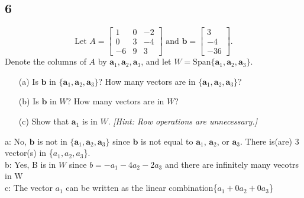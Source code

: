 \documentclass{article}
\begin{document}
\subsection*{6}
\[
\text{Let } A = \begin{bmatrix} 1 & 0 & -2 \\ 0 & 3 & -4 \\ -6 & 9 & 3 \end{bmatrix} 
\text{ and } \mathbf{b} = \begin{bmatrix} 3 \\ -4 \\ -36 \end{bmatrix}.
\]
Denote the columns of \( A \) by \( \mathbf{a}_1, \mathbf{a}_2, \mathbf{a}_3 \), and let \( W = \text{Span} \{\mathbf{a}_1, \mathbf{a}_2, \mathbf{a}_3\} \).

\begin{enumerate}
    \item[(a)] Is \( \mathbf{b} \) in \( \{\mathbf{a}_1, \mathbf{a}_2, \mathbf{a}_3\} \)? How many vectors are in \( \{\mathbf{a}_1, \mathbf{a}_2, \mathbf{a}_3\} \)?
    \item[(b)] Is \( \mathbf{b} \) in \( W \)? How many vectors are in \( W \)?
    \item[(c)] Show that \( \mathbf{a}_1 \) is in \( W \). \textit{[Hint: Row operations are unnecessary.]}
\end{enumerate}
a: No, $\mathbf{b}$ is not in $\{\mathbf{a}_1, \mathbf{a}_2, \mathbf{a}_3\}$ since $\mathbf{b}$ is not equal to $\mathbf{a}_1$, $\mathbf{a}_2$, or $\mathbf{a}_3$. There is(are) 3 vector(s) in \{$a_1, a_2, a_3$\}. \\
b: Yes, B is in $W$ since $b=-a_1-4a_2-2a_3$ and there are infinitely many vecotrs in W \\
c: The vector $a_1$ can be written as the linear combination\{$ a_1+0a_2+0a_3$\}
\end{document}
